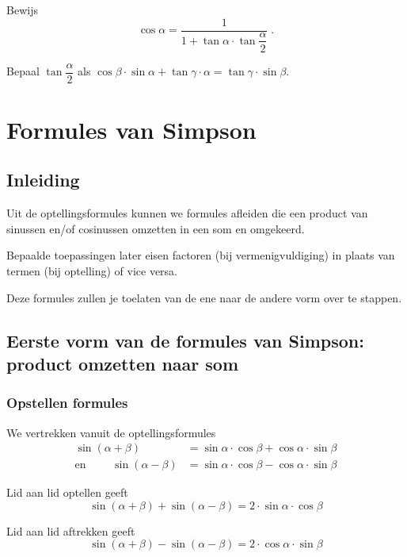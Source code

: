 \documentclass[a4paper,12pt]{article}
\begin{document}
\begin{oefening}
Bewijs
$$\cos\alpha=\dfrac{1}{1+\tan\alpha\cdot\tan\dfrac{\alpha}{2}}\;.$$
\end{oefening}

\begin{oefening}
Bepaal $\tan\dfrac{\alpha}{2}$ als $\cos\beta\cdot\sin\alpha+\tan\gamma\cdot\alpha=\tan\gamma\cdot\sin\beta$.
\end{oefening}


\newpage
\section{Formules van Simpson}

\subsection{Inleiding}

Uit de optellingsformules kunnen we formules afleiden die een product van
sinussen en/of cosinussen omzetten in een som en omgekeerd.

Bepaalde toepassingen later eisen factoren (bij vermenigvuldiging) in plaats van
termen (bij optelling) of vice versa.

Deze formules zullen je toelaten van de ene naar de andere vorm over te stappen.

\subsection{Eerste vorm van de formules van Simpson: product omzetten naar som}

\subsubsection*{Opstellen formules}

We vertrekken vanuit de optellingsformules
\begin{align*}
                   \sin(\alpha + \beta) &= \sin\alpha\cdot\cos\beta + \cos\alpha\cdot\sin\beta\\
  \mbox{en }\qquad \sin(\alpha - \beta) &= \sin\alpha\cdot\cos\beta - \cos\alpha\cdot\sin\beta
\end{align*}

Lid aan lid optellen geeft
$$\sin(\alpha+\beta) + \sin(\alpha - \beta) = 2\cdot\sin\alpha\cdot\cos\beta$$

Lid aan lid aftrekken geeft
$$\sin(\alpha+\beta) - \sin(\alpha - \beta) = 2\cdot\cos\alpha\cdot\sin\beta$$
\end{document}
